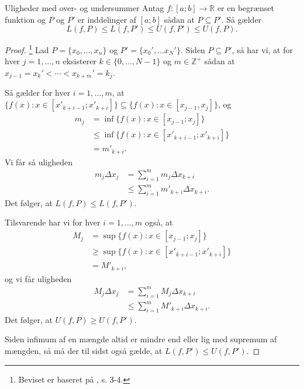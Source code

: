 \begin{theorem}[label=theo:ulighed_overundersum]{Uligheder med over- og undersummer}{}
  Antag $f:[a;b] \to \mathbb{R}$ er en begrænset funktion og $P$ og $P'$ er inddelinger af $[a;b]$ sådan at $P \subseteq P'$. Så gælder
  \[
  L(f, P)\leq L(f, P') \leq  U(f, P') \leq U(f, P).
  \] 
\end{theorem}
\begin{proof} 
  \footnote{Beviset er baseret på \cite{Axler2020}, s. 3-4.} 
  Lad $P=\{ x_0,\ldots , x_n \} $ og $P'=\{x_0',\ldots x_N'\}$. 
  Siden $P \subseteq P'$, så har vi, at for hver $j=1,\ldots , n$ eksisterer $k \in \{ 0,\ldots , N-1 \} $ og $m \in \mathbb{Z}^+$ sådan at $x _{j-1} =x_k'< \cdots < x _{k+m}'=k_j$.

  Så gælder for hver $i=1, \ldots , m$, at ${\{ f(x):x \in [x'_{k+i-1};x'_{k+i }] \} \subseteq \{ f(x):x \in [x_{j-1},x_j]\}  }$, og 
  \begin{equation*}
  \begin{split}
   m_j&=\inf \{ f(x):x \in [x_{j-1};x_j]\} \\
    &\leq  \inf \{ f(x):x \in [x'_{k+i-1};x'_{k+i }] \}\\
    &=m'_{k+i}.
  \end{split}
  \end{equation*}
Vi får så uligheden 
\begin{equation*}
\begin{split}
  m_j \Delta x_j&=\sum_{i=1}^{m} m_j \Delta x _{k+i}\\
  &\leq \sum_{i=1}^{m} m' _{k+i} \Delta x _{k+i}.
\end{split}
\end{equation*}
  Det følger, at $L(f, P) \leq L(f, P')$. 

  Tilsvarende har vi for hver $i=1,\ldots, m$ også, at
  \begin{equation*}
  \begin{split}
    M_j&=\sup \{ f(x):x \in [x_{j-1};x_j] \} \\
    &\geq \sup \{ f(x):x \in [x'_{k+i-1};x'_{k+i}] \} \\
    &=M'_{k+i},
  \end{split}
  \end{equation*}
  og vi får uligheden
  \begin{equation*}
  \begin{split}
  M_j \Delta x_j&=\sum_{i=1}^{m} M_j \Delta x _{k+i}\\
  &\leq \sum_{i=1}^{m} M' _{k+i} \Delta x _{k+i}.
  \end{split}
  \end{equation*}
  Det følger, at $U(f, P) \geq U(f, P')$.

  Siden infimum af en mængde altid er mindre end eller lig med supremum af mængden, så må der til sidst også gælde, at $L(f, P')\leq U(f, P')$.
\end{proof}

